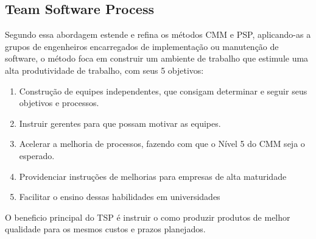 \documentclass[12pt]{article}
\begin{document}
\subsection{Team Software Process}
Segundo \cite{humphrey1999pathways} essa abordagem estende e refina os métodos CMM e PSP, aplicando-as a grupos de engenheiros encarregados de implementação ou manutenção de software, o método foca em construir um ambiente de trabalho que estimule uma alta produtividade de trabalho, com seus 5 objetivos:
\begin{enumerate}
    \item Construção de equipes independentes, que consigam determinar e seguir seus objetivos e processos.
    \item Instruir gerentes para que possam motivar as equipes.
    \item Acelerar a melhoria de processos, fazendo com que o Nível 5 do CMM seja o esperado.
    \item Providenciar instruções de melhorias para empresas de alta maturidade
    \item Facilitar o ensino dessas habilidades em universidades
\end{enumerate}
O beneficio principal do TSP é instruir o como produzir produtos de melhor qualidade para os mesmos custos e prazos planejados.
\end{document}
